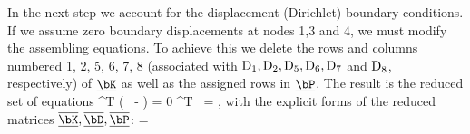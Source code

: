 \bigskip
In the next step we account for the displacement (Dirichlet) boundary
conditions. If we assume zero boundary displacements at nodes 1,3 and 4, we
must modify the assembling equations. To achieve this we delete the rows
and columns numbered 1, 2, 5, 6, 7, 8 (associated with $ \rm D_{1},D_{2},D_{5},D_{6},D_{7}$
and $\rm D_{8}$, respectively) of $\underline{\bK}$ as well as the 
assigned rows in $\underline \bP$. The result is the reduced set of equations
\eb\rm
\underline {\overline\bD}^T
(\underline{\overline\bK} \, \underline {\overline\bD} - 
\underline {\overline\bP} ) = 0 
\quad\forall\; \underline{\overline\bD}^T 
\quad \rightarrow \quad 
\underline{\overline\bK} \, 
\underline {\overline\bD} = \underline {\overline\bP},
\label{reducedstemaafterdirichletbc}
\ee
with the explicit forms of the reduced matrices 
$\underline{\overline\bK}, \underline {\overline\bD}, \underline {\overline\bP}$:
\eb
{} \;
=
\ee


